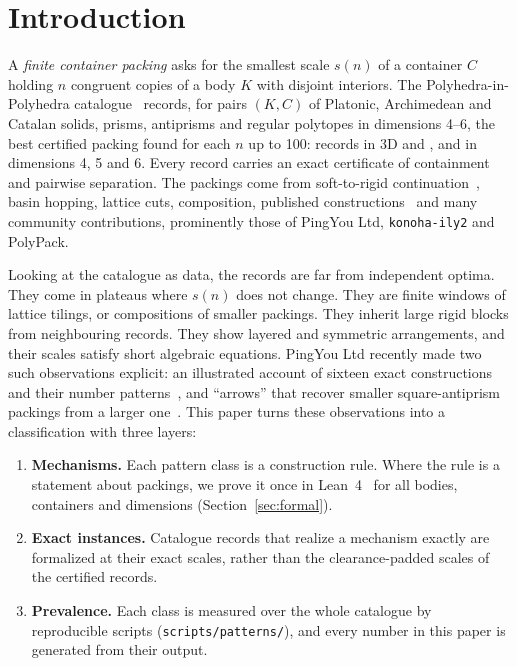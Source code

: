 \documentclass[11pt,a4paper]{article}
\newcommand{\code}[1]{\texttt{\nolinkurl{#1}}}
\theoremstyle{definition}
\theoremstyle{remark}
\begin{document}
\section{Introduction}

A \emph{finite container packing} asks for the smallest scale $s(n)$ of a container $C$ holding $n$ congruent copies of a body $K$ with disjoint interiors. The Polyhedra-in-Polyhedra catalogue~\cite{archive} records, for \nFamilies{} pairs $(K,C)$ of Platonic, Archimedean and Catalan solids, prisms, antiprisms and regular polytopes in dimensions 4--6, the best certified packing found for each $n$ up to 100: \nThreeD{} records in 3D and \nFourD{}, \nFiveD{} and \nSixD{} in dimensions 4, 5 and 6. Every record carries an exact certificate of containment and pairwise separation. The packings come from soft-to-rigid continuation~\cite{nakajima2026,zarzueloMethods}, basin hopping, lattice cuts, composition, published constructions~\cite{berthold2026} and many community contributions, prominently those of PingYou Ltd, \code{konoha-ily2} and PolyPack.

Looking at the catalogue as data, the records are far from independent optima. They come in plateaus where $s(n)$ does not change. They are finite windows of lattice tilings, or compositions of smaller packings. They inherit large rigid blocks from neighbouring records. They show layered and symmetric arrangements, and their scales satisfy short algebraic equations. PingYou Ltd recently made two such observations explicit: an illustrated account of sixteen exact constructions and their number patterns~\cite{pingSixteen}, and ``arrows'' that recover smaller square-antiprism packings from a larger one~\cite{pingArrows}. This paper turns these observations into a classification with three layers:

\begin{enumerate}
\item \textbf{Mechanisms.} Each pattern class is a construction rule. Where the rule is a statement about packings, we prove it once in Lean~4~\cite{mathlib} for all bodies, containers and dimensions (Section~\ref{sec:formal}).
\item \textbf{Exact instances.} Catalogue records that realize a mechanism exactly are formalized at their exact scales, rather than the clearance-padded scales of the certified records.
\item \textbf{Prevalence.} Each class is measured over the whole catalogue by reproducible scripts (\code{scripts/patterns/}), and every number in this paper is generated from their output.
\end{enumerate}
\end{document}
